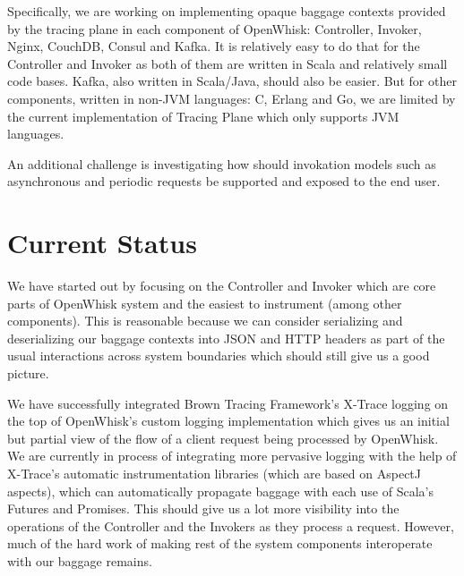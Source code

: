 Specifically, we are working on implementing opaque baggage contexts provided by the tracing plane in each component of OpenWhisk: Controller, Invoker, Nginx, CouchDB, Consul and Kafka. It is relatively easy to do that for the Controller and Invoker as both of them are written in Scala and relatively small code bases. Kafka, also written in Scala/Java, should also be easier. But for other components, written in non-JVM languages: C, Erlang and Go, we are limited by the current implementation of Tracing Plane which only supports JVM languages.

An additional challenge is investigating how should invokation models such as asynchronous and periodic requests be supported and exposed to the end user.

\section{Current Status}
We have started out by focusing on the Controller and Invoker which are core parts of OpenWhisk system and the easiest to instrument (among other components). This is reasonable because we can consider serializing and deserializing our baggage contexts into JSON and HTTP headers as part of the usual interactions across system boundaries which should still give us a good picture.

We have successfully integrated\cite{web:instru} Brown Tracing Framework's\cite{web:btf} X-Trace logging on the top of OpenWhisk's custom logging implementation which gives us an initial but partial view of the flow of a client request being processed by OpenWhisk. We are currently in process of integrating more pervasive logging with the help of X-Trace's automatic instrumentation libraries (which are based on AspectJ aspects), which can automatically propagate baggage with each use of Scala's Futures and Promises. This should give us a lot more visibility into the operations of the Controller and the Invokers as they process a request. However, much of the hard work of making rest of the system components interoperate with our baggage remains.
